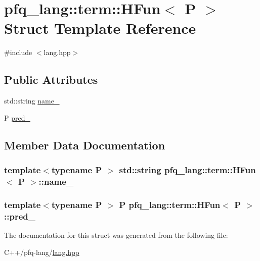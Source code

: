 \hypertarget{structpfq__lang_1_1term_1_1HFun}{\section{pfq\-\_\-lang\-:\-:term\-:\-:H\-Fun$<$ P $>$ Struct Template Reference}
\label{structpfq__lang_1_1term_1_1HFun}
}


{\ttfamily \#include $<$lang.\-hpp$>$}

\subsection*{Public Attributes}
\begin{DoxyCompactItemize}
\item 
std\-::string \hyperlink{structpfq__lang_1_1term_1_1HFun_ae20ef1dda67f36ac1d73bde9eb7ffece}{name\-\_\-}
\item 
P \hyperlink{structpfq__lang_1_1term_1_1HFun_a21b242e11fd7818e6e7c1242433951db}{pred\-\_\-}
\end{DoxyCompactItemize}


\subsection{Member Data Documentation}
\hypertarget{structpfq__lang_1_1term_1_1HFun_ae20ef1dda67f36ac1d73bde9eb7ffece}{
\subsubsection[{name\-\_\-}]{\setlength{\rightskip}{0pt plus 5cm}template$<$typename P $>$ std\-::string {\bf pfq\-\_\-lang\-::term\-::\-H\-Fun}$<$ P $>$\-::name\-\_\-}}\label{structpfq__lang_1_1term_1_1HFun_ae20ef1dda67f36ac1d73bde9eb7ffece}
\hypertarget{structpfq__lang_1_1term_1_1HFun_a21b242e11fd7818e6e7c1242433951db}{
\subsubsection[{pred\-\_\-}]{\setlength{\rightskip}{0pt plus 5cm}template$<$typename P $>$ P {\bf pfq\-\_\-lang\-::term\-::\-H\-Fun}$<$ P $>$\-::pred\-\_\-}}\label{structpfq__lang_1_1term_1_1HFun_a21b242e11fd7818e6e7c1242433951db}


The documentation for this struct was generated from the following file\-:\begin{DoxyCompactItemize}
\item 
C++/pfq-\/lang/\hyperlink{lang_8hpp}{lang.\-hpp}\end{DoxyCompactItemize}
